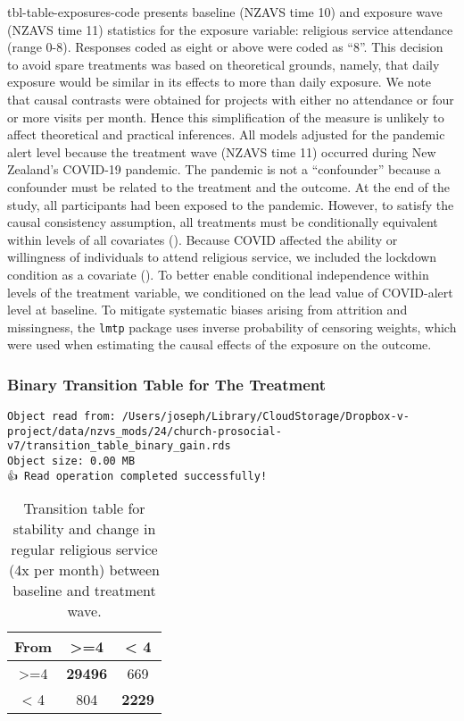 \documentclass[
  single column]{article}
\begin{document}
tbl-table-exposures-code presents baseline (NZAVS time 10) and exposure
wave (NZAVS time 11) statistics for the exposure variable: religious
service attendance (range 0-8). Responses coded as eight or above were
coded as ``8''. This decision to avoid spare treatments was based on
theoretical grounds, namely, that daily exposure would be similar in its
effects to more than daily exposure. We note that causal contrasts were
obtained for projects with either no attendance or four or more visits
per month. Hence this simplification of the measure is unlikely to
affect theoretical and practical inferences. All models adjusted for the
pandemic alert level because the treatment wave (NZAVS time 11) occurred
during New Zealand's COVID-19 pandemic. The pandemic is not a
``confounder'' because a confounder must be related to the treatment and
the outcome. At the end of the study, all participants had been exposed
to the pandemic. However, to satisfy the causal consistency assumption,
all treatments must be conditionally equivalent within levels of all
covariates (). Because COVID affected the ability or willingness of individuals
to attend religious service, we included the lockdown condition as a
covariate (). To better enable
conditional independence within levels of the treatment variable, we
conditioned on the lead value of COVID-alert level at baseline. To
mitigate systematic biases arising from attrition and missingness, the
\texttt{lmtp} package uses inverse probability of censoring weights,
which were used when estimating the causal effects of the exposure on
the outcome.

\subsubsection{Binary Transition Table for The
Treatment}\label{binary-transition-table-for-the-treatment}

\begin{verbatim}
Object read from: /Users/joseph/Library/CloudStorage/Dropbox-v-project/data/nzvs_mods/24/church-prosocial-v7/transition_table_binary_gain.rds
Object size: 0.00 MB
👍 Read operation completed successfully!
\end{verbatim}

\begin{longtable}[]{@{}ccc@{}}

\caption{\label{tbl-transition-tablegain}Transition table for stability
and change in regular religious service (4x per month) between baseline
and treatment wave.}

\tabularnewline

\toprule\noalign{}
From & \textgreater=4 & \textless{} 4 \\
\midrule\noalign{}
\endhead
\bottomrule\noalign{}
\endlastfoot
\textgreater=4 & \textbf{29496} & 669 \\
\textless{} 4 & 804 & \textbf{2229} \\

\end{longtable}
\end{document}
